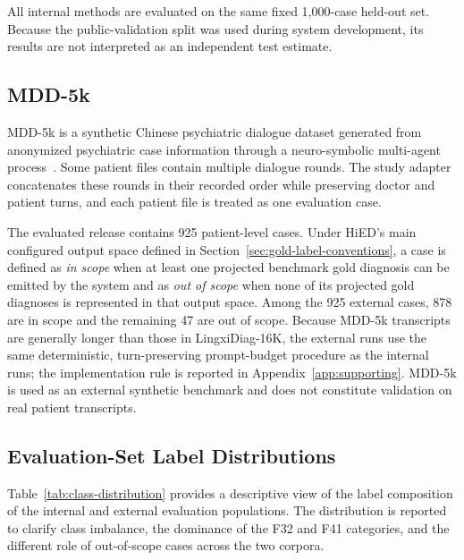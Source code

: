 \documentclass[12pt,a4paper,oneside]{report}
\begin{document}
All internal methods are evaluated on the same fixed 1,000-case held-out set. Because the public-validation split was used during system development, its results are not interpreted as an independent test estimate.

\subsection{MDD-5k}

MDD-5k is a synthetic Chinese psychiatric dialogue dataset generated from anonymized psychiatric case information through a neuro-symbolic multi-agent process~\citep{yin2024mdd5k}. Some patient files contain multiple dialogue rounds. The study adapter concatenates these rounds in their recorded order while preserving doctor and patient turns, and each patient file is treated as one evaluation case.

The evaluated release contains 925 patient-level cases. Under HiED's main configured output space defined in Section~\ref{sec:gold-label-conventions}, a case is defined as \emph{in scope} when at least one projected benchmark gold diagnosis can be emitted by the system and as \emph{out of scope} when none of its projected gold diagnoses is represented in that output space. Among the 925 external cases, 878 are in scope and the remaining 47 are out of scope. Because MDD-5k transcripts are generally longer than those in LingxiDiag-16K, the external runs use the same deterministic, turn-preserving prompt-budget procedure as the internal runs; the implementation rule is reported in Appendix~\ref{app:supporting}. MDD-5k is used as an external synthetic benchmark and does not constitute validation on real patient transcripts.

\subsection{Evaluation-Set Label Distributions}

Table~\ref{tab:class-distribution} provides a descriptive view of the label composition of the internal and external evaluation populations. The distribution is reported to clarify class imbalance, the dominance of the F32 and F41 categories, and the different role of out-of-scope cases across the two corpora.
\end{document}
